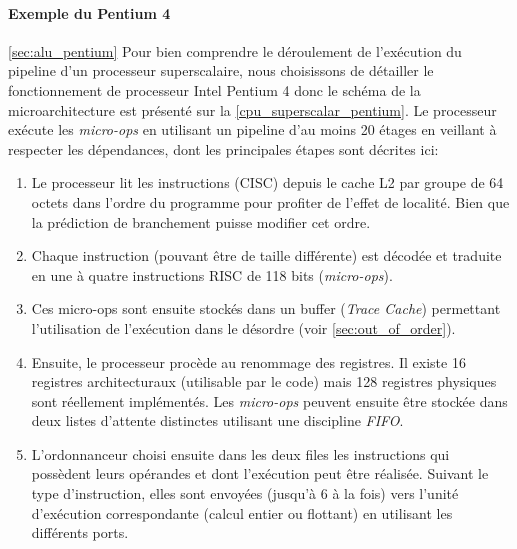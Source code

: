 \paragraph{Exemple du Pentium 4}\autoref{sec:alu_pentium}
Pour bien comprendre le déroulement de l'exécution du pipeline d'un processeur superscalaire, nous choisissons de détailler le fonctionnement de processeur Intel Pentium 4 \cite{stallings2003organisation} donc le schéma de la microarchitecture est présenté sur la \autoref{cpu_superscalar_pentium}. Le processeur exécute les \textit{micro-ops} en utilisant un pipeline d'au moins 20 étages en veillant à respecter les dépendances, dont les principales étapes sont décrites ici: 

\begin{enumerate}     
\item Le processeur lit les instructions (CISC) depuis le cache L2 par groupe de 64 octets dans l'ordre du programme pour profiter de l'effet de localité. Bien que la prédiction de branchement puisse modifier cet ordre. 
\item Chaque instruction (pouvant être de taille différente) est décodée et traduite en une à quatre instructions RISC de 118 bits (\textit{micro-ops}). 
\item Ces micro-ops sont ensuite stockés dans un buffer (\textit{Trace Cache}) permettant l'utilisation de l'exécution dans le désordre (voir \autoref{sec:out_of_order}).
\item Ensuite, le processeur procède au renommage des registres. Il existe 16 registres architecturaux (utilisable par le code) mais 128 registres physiques sont réellement implémentés. Les \textit{micro-ops} peuvent ensuite être stockée dans deux listes d'attente distinctes utilisant une discipline \textit{FIFO}.
\item L'ordonnanceur choisi ensuite dans les deux files les instructions qui possèdent leurs opérandes et dont l'exécution peut être réalisée. Suivant le type d'instruction, elles sont envoyées (jusqu'à 6 à la fois) vers l'unité d'exécution correspondante (calcul entier ou flottant) en utilisant les différents ports. 
\end{enumerate}
     

